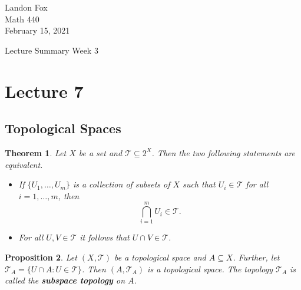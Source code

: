 \documentclass[ 12pt ]{article}
\newcounter{lecture_num}
\theoremstyle{plain}
\theoremstyle{plain}
\newtheorem{theorem}{Theorem}[lecture_num]
\newtheorem{proposition}[theorem]{Proposition}
\theoremstyle{definition}
\theoremstyle{remark}
\begin{document}
\noindent Landon Fox \\
\noindent Math 440 \\
\noindent February 15, 2021

\begin{center}
	\Large Lecture Summary Week 3
\end{center}

\setcounter{lecture_num}{7}
\setcounter{theorem}{0}
\section*{Lecture 7}

\subsection*{Topological Spaces}

\begin{theorem}
	Let $X$ be a set and $\mathcal{T} \subseteq 2^X$. Then the two following statements are equivalent.
	\begin{itemize}
		\item If $\{ U_1, \hdots, U_m \}$ is a collection of subsets of $X$ such that $U_i \in \mathcal{T}$ for all $i = 1, \hdots, m$, then $$\bigcap_{i = 1}^m U_i \in \mathcal{T}.$$
		\item For all $U, V \in \mathcal{T}$ it follows that $U \cap V \in \mathcal{T}$.
	\end{itemize}
\end{theorem}

\begin{proposition}
	Let $(X, \mathcal{T})$ be a topological space and $A \subseteq X$. Further, let $\mathcal{T}_A = \{ U \cap A : U \in \mathcal{T} \}$. Then $(A, \mathcal{T}_A)$ is a topological
	space. The topology $\mathcal{T}_A$ is called the \textbf{subspace topology} on $A$.
\end{proposition}
\end{document}
